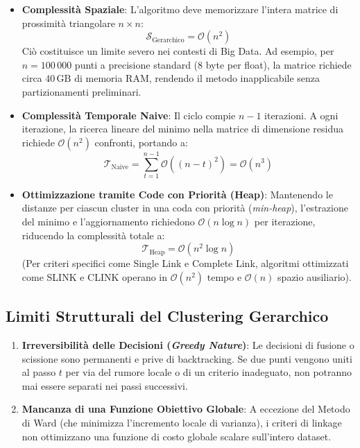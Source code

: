 \begin{itemize}
    \item \textbf{Complessità Spaziale}: L'algoritmo deve memorizzare l'intera matrice di prossimità triangolare $n \times n$:
    \begin{equation}
        \mathcal{S}_{\text{Gerarchico}} = \mathcal{O}(n^2)
    \end{equation}
    Ciò costituisce un limite severo nei contesti di Big Data. Ad esempio, per $n = 100\,000$ punti a precisione standard (8 byte per float), la matrice richiede circa $40\,\text{GB}$ di memoria RAM, rendendo il metodo inapplicabile senza partizionamenti preliminari.
    \item \textbf{Complessità Temporale Naive}: Il ciclo compie $n - 1$ iterazioni. A ogni iterazione, la ricerca lineare del minimo nella matrice di dimensione residua richiede $\mathcal{O}(n^2)$ confronti, portando a:
    \begin{equation}
        \mathcal{T}_{\text{Naive}} = \sum_{t=1}^{n-1} \mathcal{O}((n - t)^2) = \mathcal{O}(n^3)
    \end{equation}
    \item \textbf{Ottimizzazione tramite Code con Priorità (Heap)}: Mantenendo le distanze per ciascun cluster in una coda con priorità (\textit{min-heap}), l'estrazione del minimo e l'aggiornamento richiedono $\mathcal{O}(n \log n)$ per iterazione, riducendo la complessità totale a:
    \begin{equation}
        \mathcal{T}_{\text{Heap}} = \mathcal{O}(n^2 \log n)
    \end{equation}
    (Per criteri specifici come Single Link e Complete Link, algoritmi ottimizzati come SLINK e CLINK operano in $\mathcal{O}(n^2)$ tempo e $\mathcal{O}(n)$ spazio ausiliario).
\end{itemize}

\subsection{Limiti Strutturali del Clustering Gerarchico}

\begin{enumerate}
    \item \textbf{Irreversibilità delle Decisioni (\textit{Greedy Nature})}: Le decisioni di fusione o scissione sono permanenti e prive di backtracking. Se due punti vengono uniti al passo $t$ per via del rumore locale o di un criterio inadeguato, non potranno mai essere separati nei passi successivi.
    \item \textbf{Mancanza di una Funzione Obiettivo Globale}: A eccezione del Metodo di Ward (che minimizza l'incremento locale di varianza), i criteri di linkage non ottimizzano una funzione di costo globale scalare sull'intero dataset.
\end{enumerate}

